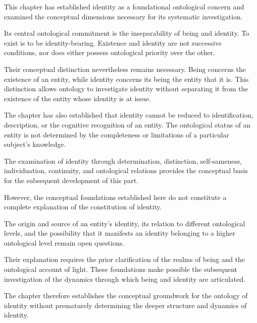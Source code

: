 This chapter has established identity as a foundational
ontological concern and examined the conceptual
dimensions necessary for its systematic investigation.

Its central ontological commitment is the inseparability
of being and identity. To exist is to be identity-bearing.
Existence and identity are not successive conditions,
nor does either possess ontological priority over
the other.

Their conceptual distinction nevertheless remains
necessary. Being concerns the existence of an entity,
while identity concerns its being the entity that it
is. This distinction allows ontology to investigate
identity without separating it from the existence
of the entity whose identity is at issue.

The chapter has also established that identity cannot
be reduced to identification, description, or the
cognitive recognition of an entity. The ontological
status of an entity is not determined by the completeness
or limitations of a particular subject's knowledge.

The examination of identity through determination,
distinction, self-sameness, individuation, continuity,
and ontological relations provides the conceptual
basis for the subsequent development of this part.

However, the conceptual foundations established here
do not constitute a complete explanation of the
constitution of identity.

The origin and source of an entity's identity, its
relation to different ontological levels, and the
possibility that it manifests an identity belonging
to a higher ontological level remain open questions.

Their explanation requires the prior clarification
of the realms of being and the ontological account
of light. These foundations make possible the
subsequent investigation of the dynamics through
which being and identity are articulated.

The chapter therefore establishes the conceptual
groundwork for the ontology of identity without
prematurely determining the deeper structure and
dynamics of identity.


